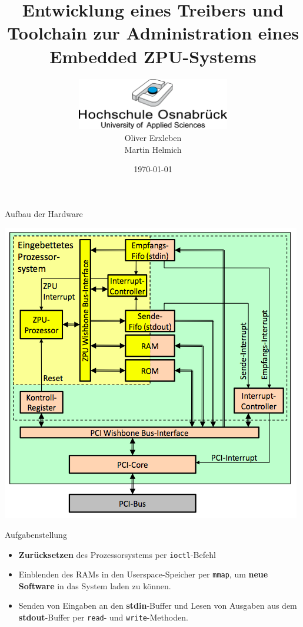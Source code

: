 \documentclass[10pt]{beamer}
\title{Entwicklung eines Treibers und Toolchain zur Administration eines Embedded ZPU-Systems}
\author{\includegraphics[width=0.5\textwidth]{images/hs_os}\\\vspace{0.5cm}
Oliver Erxleben\\Martin Helmich}
\date{\today}
\begin{document}
    \thispagestyle{empty}
	\frame{\titlepage}
	
	\begin{frame}{Aufbau der Hardware}
		\begin{center}
		\includegraphics[height=0.9\textheight]{images/zpu_architecture.png}
		\end{center}
	\end{frame}
	
	\begin{frame}{Aufgabenstellung}
		\begin{itemize}
			\item \textbf{Zurücksetzen} des Prozessorsystems per \texttt{ioctl}-Befehl
			\item Einblenden des RAMs in den Userspace-Speicher per \texttt{mmap}, um \textbf{neue Software} in das System laden zu können.
			\item Senden von Eingaben an den \textbf{stdin}-Buffer und Lesen von Ausgaben aus dem \textbf{stdout}-Buffer per \texttt{read}- und \texttt{write}-Methoden.
		\end{itemize}
	\end{frame}
	
\end{document}
